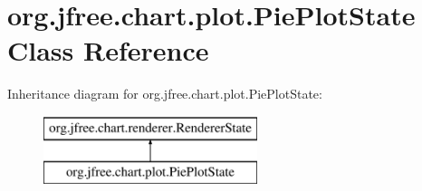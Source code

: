 \hypertarget{classorg_1_1jfree_1_1chart_1_1plot_1_1_pie_plot_state}{}\section{org.\+jfree.\+chart.\+plot.\+Pie\+Plot\+State Class Reference}
\label{classorg_1_1jfree_1_1chart_1_1plot_1_1_pie_plot_state}
Inheritance diagram for org.\+jfree.\+chart.\+plot.\+Pie\+Plot\+State\+:\begin{figure}[H]
\begin{center}
\leavevmode
\includegraphics[height=2.000000cm]{classorg_1_1jfree_1_1chart_1_1plot_1_1_pie_plot_state}
\end{center}
\end{figure}
